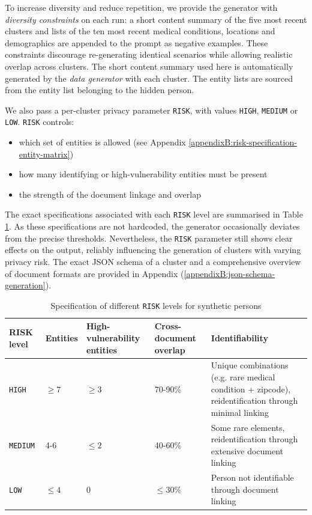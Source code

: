 To increase diversity and reduce repetition, we provide the generator with \textit{diversity constraints} on each run: a short content summary of the five most recent clusters and lists of the ten most recent medical conditions, locations and demographics are appended to the prompt as negative examples. These constraints discourage re-generating identical scenarios while allowing realistic overlap across clusters. The short content summary used here is automatically generated by the \textit{data generator} with each cluster. The entity lists are sourced from the entity list belonging to the hidden person.

We also pass a per-cluster privacy parameter \texttt{RISK}, with values \texttt{HIGH}, \texttt{MEDIUM} or \texttt{LOW}. \texttt{RISK} controls:
\begin{itemize}
  \item which set of entities is allowed (see Appendix \ref{appendixB:risk-specification-entity-matrix})
  \item how many identifying or high-vulnerability entities must be present
  \item the strength of the document linkage and overlap
\end{itemize}
 
The exact specifications associated with each \texttt{RISK} level are summarised in Table \ref{evaluation-tab:data-gen-risk-profiles}. As these specifications are not hardcoded, the generator occasionally deviates from the precise thresholds. Nevertheless, the \texttt{RISK} parameter still shows clear effects on the output, reliably influencing the generation of clusters with varying privacy risk. The exact JSON schema of a cluster and a comprehensive overview of document formats are provided in Appendix (\ref{appendixB:json-schema-generation}).

\begin{table}[h]
\centering
\caption{Specification of different \texttt{RISK} levels for synthetic persons}
\label{evaluation-tab:data-gen-risk-profiles}
\begin{tabular}{l p{1.5cm} p{2cm} p{2cm} p{5cm}}
\hline
\textbf{RISK level} & \textbf{Entities} & \textbf{High-vulnerability entities} & \textbf{Cross-document overlap} & \textbf{Identifiability} \\
\hline
\texttt{HIGH} & $\geq 7$ & $\geq 3$ & 70-90\% & Unique combinations (e.g. rare medical condition + zipcode), reidentification through minimal linking \\
\texttt{MEDIUM} & 4-6 & $\leq 2$ & 40-60\% & Some rare elements, reidentification through extensive document linking \\
\texttt{LOW} & $\leq 4$ & 0 & $\leq 30\%$ & Person not identifiable through document linking \\
\hline
\end{tabular}
\end{table}


